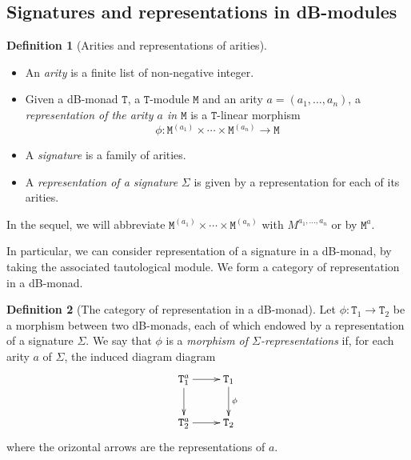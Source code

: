 \documentclass[a4paper,twoside,12pt]{article}
\theoremstyle{definition}
\newtheorem{definition}{Definition}
\theoremstyle{remark}
\theoremstyle{example}
\newcommand{\TT}{\mathtt{T}}
\newcommand{\MM}{\mathtt{M}}
\begin{document}
\subsection{Signatures and representations in dB-modules}
\label{sec:signatures-representations}

\begin{definition}[Arities and representations of arities]
  \hfill
  \begin{itemize}
  \item An \emph{arity} is a finite list of non-negative integer.
  \item Given a dB-monad $\TT$, a $\TT$-module $\MM$ and an arity
    $a=(a_1,\dots,a_n)$, a \emph{representation of the arity $a$ in
      $\MM$} is a $\TT$-linear morphism
    \begin{equation*}
      \phi:\MM^{(a_1)}\times\cdots\times\MM^{(a_n)} \longrightarrow \MM
    \end{equation*}
  \item A \emph{signature} is a family of arities.
  \item A \emph{representation of a signature} $\Sigma$ is given by a
    representation for each of its arities.
  \end{itemize}
\end{definition}

In the sequel, we will abbreviate
$\MM^{(a_1)}\times\cdots\times\MM^{(a_n)}$ with $M^{a_1,\dots,a_n}$ or
by $\MM^a$.

In particular, we can consider representation of a signature in a
dB-monad, by taking the associated tautological module.  We form a
category of representation in a dB-monad.

\begin{definition}[The category of representation in a dB-monad]
  Let $\phi \colon \TT_1 \to \TT_2$ be a morphism between two
  dB-monads, each of which endowed by a representation of a signature
  $\Sigma$.  We say that $\phi$ is a \emph{morphism of
    $\Sigma$-representations} if, for each arity $a$ of $\Sigma$, the
  induced diagram diagram
  \begin{equation*}
    \xymatrix{
      \TT_1^a\ar[d]\ar[r] & \TT_1\ar[d]^\phi \\
      \TT_2^a \ar[r] & \TT_2}
  \end{equation*}
  where the orizontal arrows are the representations of $a$.
\end{definition}


%

\end{document}
